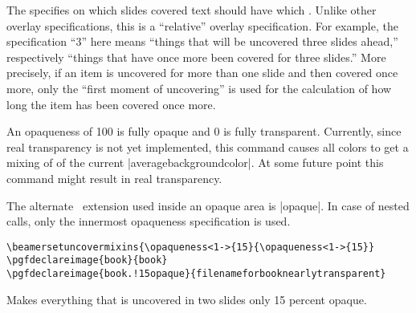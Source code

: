 \begin{command}{\opaqueness{}}
  The  specifies on which slides covered
  text should have which . Unlike
  other overlay specifications, this  is a
  ``relative'' overlay specification. For example, the specification
  ``3'' here means ``things that will be uncovered three slides
  ahead,'' respectively ``things that have once more been covered for
  three slides.'' More precisely, if an item is uncovered for more
  than one slide and then covered once more, only the ``first moment
  of uncovering'' is used for the calculation of how long the item has
  been covered once more.

  An opaqueness of 100 is fully opaque and 0 is fully
  transparent. Currently, since real transparency is not yet
  implemented, this command causes all colors to get a mixing of
   of the current
  |averagebackgroundcolor|. At some future point this command might
  result in real transparency.

  The alternate \pgf\ extension used inside an opaque area is
  |opaque|. In case of nested calls,
  only the innermost opaqueness specification is used. 
  \example
\begin{verbatim}
\beamersetuncovermixins{\opaqueness<1->{15}{\opaqueness<1->{15}}
\pgfdeclareimage{book}{book}
\pgfdeclareimage{book.!15opaque}{filenameforbooknearlytransparent}
\end{verbatim}
  Makes everything that is uncovered in two slides only 15 percent
  opaque. 
\end{command}





